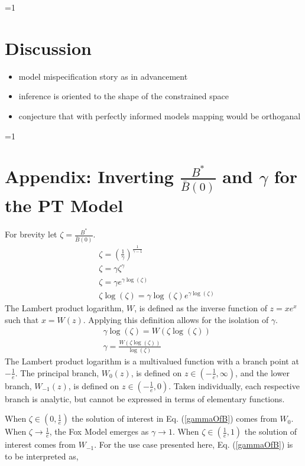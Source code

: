 \documentclass[12pt]{article}
\newcounter{alphasect}
\def\alphainsection{0}
\let\oldsection=\section
\def\section{%
  \ifnum\alphainsection=1%
    \addtocounter{alphasect}{1}
  \fi%
\oldsection}%
\begin{document}
%
\section{Discussion}

\begin{itemize}
\item model mispecification story as in advancement
\item inference is oriented to the shape of the constrained space
\item conjecture that with perfectly informed models mapping would be orthoganal
\end{itemize}


%
\clearpage

%
\section{Appendix\label{lambApp}: Inverting $\frac{B^*}{\bar B(0)}$ and $\gamma$ for the PT Model}
For brevity let $\zeta=\frac{B^*}{\bar B(0)}$.
\begin{align*}
&\zeta=\left(\frac{1}{\gamma}\right)^{\frac{1}{\gamma-1}}\\
&\zeta=\gamma\zeta^{\gamma}\\
&\zeta=\gamma e^{\gamma\log(\zeta)}\\
&\zeta\log(\zeta)=\gamma\log(\zeta) e^{\gamma\log(\zeta)}
\end{align*}
The Lambert product logarithm, $W$, is defined as the inverse function of $z=xe^x$ such that $x=W(z)$. 
Applying this definition allows for the isolation of $\gamma$.
\begin{align}
&\gamma\log(\zeta)=W\left(\zeta\log(\zeta)\right) \nonumber\\
&\gamma=\frac{W\left(\zeta\log(\zeta)\right)}{\log(\zeta)} \label{gammaOfZeta}
\end{align}
The Lambert product logarithm is a multivalued function with a branch point at 
$-\frac{1}{e}$. The principal branch, $W_0(z)$, is defined on $z\in\left(-\frac{1}{e}, \infty\right)$, 
and the lower branch, $W_{-1}(z)$, is defined on $z\in\left(-\frac{1}{e}, 0\right)$. Taken 
individually, each respective branch is analytic, but cannot be expressed in terms 
of elementary functions.

%
When $\zeta\in\left(0, \frac{1}{e}\right)$ the solution of interest in Eq. (\ref{gammaOfB}) 
comes from $W_0$. %
When $\zeta\to\frac{1}{e}$, the Fox Model emerges as $\gamma\to1$.
When $\zeta\in\left(\frac{1}{e}, 1\right)$ the solution of interest comes from 
$W_{-1}$. For the use case presented here, Eq. (\ref{gammaOfB}) is to be interpreted as,
\end{document}
